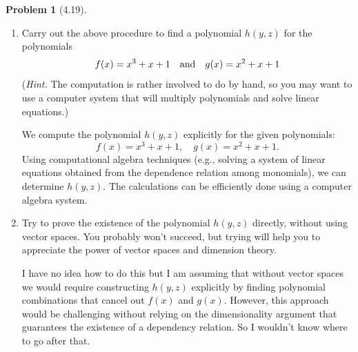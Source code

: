 \documentclass[12pt]{article}
\theoremstyle{definition}
\newtheorem{problem}{Problem}
\begin{document}
\begin{problem}[4.19]
\begin{enumerate}[label=(\alph*)]
        \begin{solution}
            We choose $K$ such that the set (4.11) contains more than $D+1$ elements. That is,
            \[
                K^2 > D+1 = (K-1)(d+e) + 1.
            \]
            Solving for $K$, we need to find an integer $K$ that satisfies this inequality. If such a $K$ exists, then the elements of (4.11) are linearly dependent in $F[x]$, meaning there exists a non-trivial linear relation among them. This implies the existence of a polynomial $h(y, z)$ such that $h(f(x), g(x)) = 0$.
            
        \end{solution}

        \item Carry out the above procedure to find a polynomial $h(y, z)$ for the polynomials
              \[
                  f(x) = x^3 + x + 1 \hspace{10px} \text{and} \hspace{10px} g(x) = x^2 + x + 1
              \]
              (\textit{Hint.} The computation is rather involved to do by hand, so you may want to use a computer
              system that will multiply polynomials and solve linear equations.)

        \begin{solution}
            We compute the polynomial $h(y, z)$ explicitly for the given polynomials:
            \[
                f(x) = x^3 + x + 1, \quad g(x) = x^2 + x + 1.
            \]
            Using computational algebra techniques (e.g., solving a system of linear 
            equations obtained from the dependence relation among monomials), we can determine 
            $h(y, z)$. The calculations can be efficiently done using a computer algebra system.
            
        \end{solution}

        \item Try to prove the existence of the polynomial $h(y, z)$ directly, without using vector spaces.
              You probably won't succeed, but trying will help you to appreciate the power of vector spaces
              and dimension theory. 
              
        \begin{solution}
            I have no idea how to do this but I am assuming that without vector spaces 
            we would require constructing 
            $h(y, z)$ explicitly by finding polynomial combinations that cancel out 
            $f(x)$ and $g(x)$. However, this approach would be challenging without relying 
            on the dimensionality argument that guarantees the existence of a 
            dependency relation. So I wouldn't know where to go after that. 
        \end{solution}
    \end{enumerate}
\end{problem}
\end{document}
